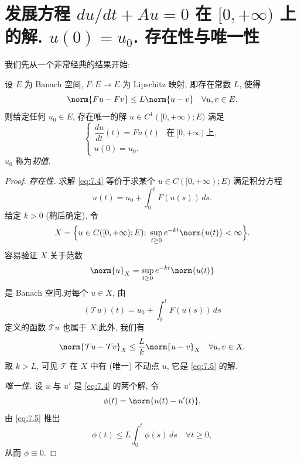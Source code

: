 \section{发展方程 \texorpdfstring{$du/dt+Au=0$}{du/dt+Au=0} 在
\texorpdfstring{$[0,+\infty)$}{[0,+∞)} 上的解.
\texorpdfstring{$u(0)=u_0$}{u(0)=u0}. 存在性与唯一性}
\label{sec:7.2}

我们先从一个非常经典的结果开始:

\begin{keytheorem}
\label{thm:7.3}
设 $E$ 为 Banach 空间, $F:E\to E$ 为 Lipschitz 映射, 即存在常数 $L$,
使得
\begin{equation*}
\norm{Fu-Fv}\le L\norm{u-v}\quad\forall u,v\in E.
\end{equation*}
则给定任何 $u_0\in E$, 存在唯一的解 $u\in C^1([0,+\infty);E)$ 满足
\begin{equation}
\begin{cases}
\dfrac{du}{dt}(t)=Fu(t) & \text{在}\ [0,+\infty)\ \text{上},\\
u(0)=u_0.
\end{cases}
\label{eq:7.4}
\end{equation}
$u_0$ 称为\emph{初值}.
\end{keytheorem}

\begin{proof}
\emph{存在性.} 求解 \eqref{eq:7.4} 等价于求某个
$u\in C([0,+\infty);E)$ 满足积分方程
\begin{equation}
u(t)=u_0+\int_0^tF(u(s))\,ds.
\label{eq:7.5}
\end{equation}
给定 $k>0$ (稍后确定), 令
\begin{equation*}
X=\Bigl\{u\in C([0,+\infty);E);\ \sup_{t\ge0}e^{-kt}\norm{u(t)}<\infty\Bigr\}.
\end{equation*}
容易验证 $X$ 关于范数
\begin{equation*}
\norm{u}_X=\sup_{t\ge0}e^{-kt}\norm{u(t)}
\end{equation*}
是 Banach 空间.对每个 $u\in X$, 由
\begin{equation*}
(\mathcal{T}u)(t)=u_0+\int_0^tF(u(s))\,ds
\end{equation*}
定义的函数 $\mathcal{T}u$ 也属于 $X$.此外, 我们有
\begin{equation*}
\norm{\mathcal{T}u-\mathcal{T}v}_X\le\frac Lk\norm{u-v}_X
\quad\forall u,v\in X.
\end{equation*}
取 $k>L$, 可见 $\mathcal{T}$ 在 $X$ 中有 (唯一) 不动点 $u$, 它是
\eqref{eq:7.5} 的解.

\emph{唯一性.} 设 $u$ 与 $u'$ 是 \eqref{eq:7.4} 的两个解, 令
\begin{equation*}
\phi(t)=\norm{u(t)-u'(t)}.
\end{equation*}
由 \eqref{eq:7.5} 推出
\begin{equation*}
\phi(t)\le L\int_0^t\phi(s)\,ds\quad\forall t\ge0,
\end{equation*}
从而 $\phi\equiv0$.
\end{proof}

